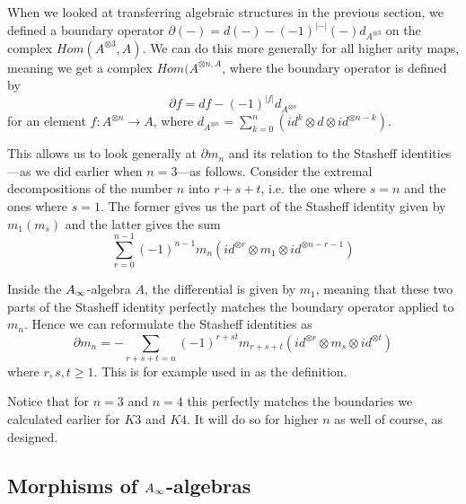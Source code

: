 When we looked at transferring algebraic structures in the previous section, we defined a boundary operator $\partial (-) = d(-)-(-1)^{|-|}(-)d_{A^{\otimes 3}}$ on the complex $Hom(A^{\otimes 3}, A)$. We can do this more generally for all higher arity maps, meaning we get a complex $Hom(A^{\otimes n, A}$, where the boundary operator is defined by
\begin{equation*}
    \partial f = df -(-1)^{|f|}d_{A^{\otimes n}}
\end{equation*}
for an element $f\colon A^{\otimes n}\longrightarrow A$, where $d_{A^{\otimes n}}= \sum_{k=0}^{n}(id^{k}\otimes d\otimes id^{\otimes n-k})$. 

This allows us to look generally at $\partial m_n$ and its relation to the Stasheff identities---as we did earlier when $n=3$---as follows. Consider the extremal decompositions of the number $n$ into $r+s+t$, i.e. the one where $s=n$ and the ones where $s=1$. The former gives us the part of the Stasheff identity given by $m_1(m_s)$ and the latter gives the sum 
\begin{equation*}
    \sum_{r=0}^{n-1} (-1)^{n-1}m_n(id^{\otimes r}\otimes m_1\otimes id^{\otimes n-r-1})
\end{equation*}

Inside the $A_{\infty}$-algebra $A$, the differential is given by $m_1$, meaning that these two parts of the Stasheff identity perfectly matches the boundary operator applied to $m_n$. Hence we can reformulate the Stasheff identities as
\begin{equation*}
    \partial m_n = - \sum_{r+s+t=n}(-1)^{r+st}m_{r+s+t}(id^{\otimes r}\otimes m_s\otimes id^{\otimes t})
\end{equation*}
where $r,s,t\geq 1$. This is for example used in \cite{AHO} as the definition. 

Notice that for $n=3$ and $n=4$ this perfectly matches the boundaries we calculated earlier for $K3$ and $K4$. It will do so for higher $n$ as well of course, as designed. 


\subsection{Morphisms of \texorpdfstring{$A_{\infty}$}{A}-algebras}


